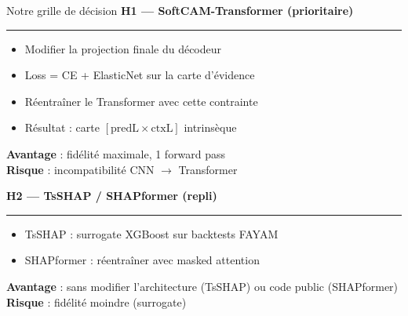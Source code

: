 \documentclass[10pt]{beamer}
\begin{document}
\begin{frame}{Notre grille de décision}
	\textbf{H1 --- SoftCAM-Transformer (prioritaire)}
	\rule{\linewidth}{0.5pt}
	
	\begin{itemize}
		\item Modifier la projection finale du décodeur
		\item Loss = CE + ElasticNet sur la carte d'évidence
		\item Réentraîner le Transformer avec cette contrainte
		\item Résultat : carte $[\text{predL} \times \text{ctxL}]$ intrinsèque
	\end{itemize}
	
	\vspace{2pt}
	\textbf{Avantage} : fidélité maximale, 1 forward pass\\
	\textbf{Risque} : incompatibilité CNN $\to$ Transformer
	
	\vspace{8pt}
	
	\textbf{H2 --- TsSHAP / SHAPformer (repli)}
	\rule{\linewidth}{0.5pt}
	
	\begin{itemize}
		\item TsSHAP : surrogate XGBoost sur backtests FAYAM
		\item SHAPformer : réentraîner avec masked attention
	\end{itemize}
	
	\vspace{2pt}
	\textbf{Avantage} : sans modifier l'architecture (TsSHAP) ou code public (SHAPformer)\\
	\textbf{Risque} : fidélité moindre (surrogate)
\end{frame}
\end{document}
